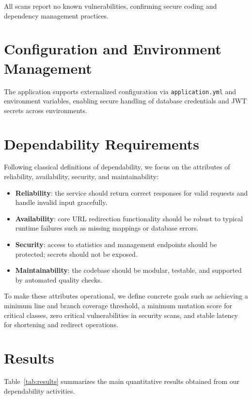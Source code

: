 \documentclass[sigconf]{acmart}
\begin{document}
All scans report no known vulnerabilities, confirming secure coding and dependency management practices.

\section{Configuration and Environment Management}
The application supports externalized configuration via \texttt{application.yml} and environment variables, enabling secure handling of database credentials and JWT secrets across environments.

\section{Dependability Requirements}
Following classical definitions of dependability, we focus on the attributes of reliability, availability, security, and maintainability:
\begin{itemize}
  \item \textbf{Reliability}: the service should return correct responses for valid requests and handle invalid input gracefully.
  \item \textbf{Availability}: core URL redirection functionality should be robust to typical runtime failures such as missing mappings or database errors.
  \item \textbf{Security}: access to statistics and management endpoints should be protected; secrets should not be exposed.
  \item \textbf{Maintainability}: the codebase should be modular, testable, and supported by automated quality checks.
\end{itemize}

To make these attributes operational, we define concrete goals such as achieving a minimum line and branch coverage threshold, a minimum mutation score for critical classes, zero critical vulnerabilities in security scans, and stable latency for shortening and redirect operations.

\section{Results}
Table~\ref{tab:results} summarizes the main quantitative results obtained from our dependability activities.
\end{document}
